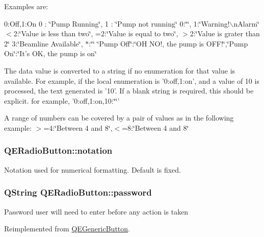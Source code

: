 Examples are:

0:Off,1:On 0 : \char`\"{}Pump Running\char`\"{}, 1 : \char`\"{}Pump not running\char`\"{} 0:\char`\"{}\char`\"{}, 1:\char`\"{}Warning!$\backslash$nAlarm\char`\"{} $<$2:\char`\"{}Value is less than two\char`\"{}, =2:\char`\"{}Value is equal to two\char`\"{}, $>$2:\char`\"{}Value is grater than 2\char`\"{} 3:\char`\"{}Beamline Available\char`\"{}, $\ast$:\char`\"{}\char`\"{} \char`\"{}Pump Off\char`\"{}:\char`\"{}OH NO!, the pump is OFF!\char`\"{},\char`\"{}Pump On\char`\"{}:\char`\"{}It's OK, the pump is on\char`\"{}

The data value is converted to a string if no enumeration for that value is available. For example, if the local enumeration is '0:off,1:on', and a value of 10 is processed, the text generated is '10'. If a blank string is required, this should be explicit. for example, '0:off,1:on,10:\char`\"{}\char`\"{}'

A range of numbers can be covered by a pair of values as in the following example: $>$=4:\char`\"{}Between 4 and 8\char`\"{},$<$=8:\char`\"{}Between 4 and 8\char`\"{} \hypertarget{classQERadioButton_a3cd753fec8e954fd5547b38f2136253c}{
\subsubsection[{notation}]{ QERadioButton::notation}}
\label{classQERadioButton_a3cd753fec8e954fd5547b38f2136253c}
Notation used for numerical formatting. Default is fixed. \hypertarget{classQERadioButton_a5c2a86f59174b8993c21cdb82535436f}{
\subsubsection[{password}]{\setlength{\rightskip}{0pt plus 5cm}QString QERadioButton::password}}
\label{classQERadioButton_a5c2a86f59174b8993c21cdb82535436f}
Password user will need to enter before any action is taken 

Reimplemented from \hyperlink{classQEGenericButton}{QEGenericButton}.

